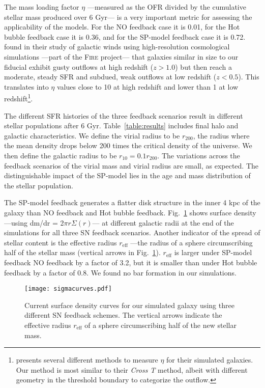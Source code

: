 \documentclass[iop]{emulateapj}
\begin{document}
The mass loading factor $\eta$ ---measured as the OFR divided by the cumulative stellar mass produced over 6 Gyr--- is a very important metric for assessing the applicability of the models. For the NO feedback case it is 0.01, for the Hot bubble feedback case it is 0.36, and for the SP-model feedback case it is 0.72. \citet{Muratov15} found in their study of galactic winds using high-resolution cosmological simulations ---part of the \textsc{Fire} project--- that galaxies similar in size to our fiducial exhibit gusty outflows at high redshift ($z>1.0$) but then reach a moderate, steady SFR and subdued, weak outflows at low redshift ($z<0.5$). This translates into $\eta$ values close to 10 at high redshift and lower than 1 at low redshift\footnote{\citet{Muratov15} presents several different methods to measure $\eta$ for their simulated galaxies. Our method is most similar to their \textit{Cross T} method, albeit with different geometry in the threshold boundary to categorize the outflow.}.

The different SFR histories of the three feedback scenarios result in different stellar populations after 6 Gyr. Table~\ref{table:results} includes final halo and galactic characteristics. We define the virial radius to be $r_{200}$, the radius where the mean density drops below 200 times the critical density of the universe. We then define the galactic radius to be $r_{10}=0.1r_{200}$. The variations across the feedback scenarios of the virial mass and virial radius are small, as expected. The distinguishable impact of the SP-model lies in the age and mass distribution of the stellar population. 

The SP-model feedback generates a flatter disk structure in the inner 4 kpc of the galaxy than NO feedback and Hot bubble feedback. Fig.~\ref{fig:sigmacurves} shows surface density ---using dm/dr = 2$\pi r\Sigma(r)$--- at different galactic radii at the end of the simulations for all three SN feedback scenarios. Another indicator of the spread of stellar content is the effective radius $r_{\mathrm{eff}}$ ---the radius of a sphere circumscribing half of the stellar mass (vertical arrows in Fig.~\ref{fig:sigmacurves}). $r_{\mathrm{eff}}$ is larger under SP-model feedback NO feedback by a factor of 3.2, but it is smaller than under Hot bubble feedback by a factor of 0.8. We found no bar formation in our simulations.



\begin{figure}
\texttt{[image: sigmacurves.pdf]}
\caption{Current surface density curves for our simulated galaxy using three different SN feedback schemes. The vertical arrows indicate the effective radius $r_{\mathrm{eff}}$ of a sphere circumscribing half of the new stellar mass.}
\label{fig:sigmacurves}
\end{figure}
\end{document}

